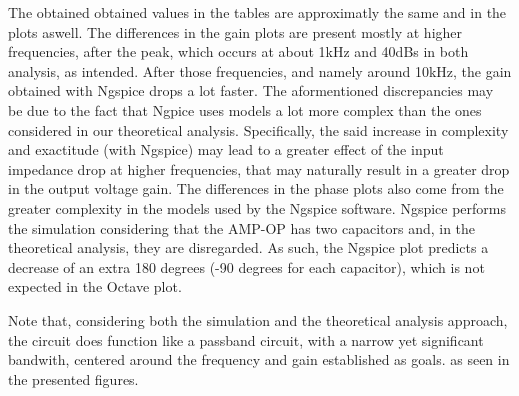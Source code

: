The obtained obtained values in the tables are approximatly the same and in the plots aswell. The differences in the gain plots are present mostly at higher frequencies, after the peak, which occurs at about 1kHz and 40dBs in both analysis, as intended. After those frequencies, and namely around 10kHz, the gain obtained with Ngspice drops a lot faster. The aformentioned discrepancies may be due to the fact that Ngpice uses models a lot more complex than the ones considered in our theoretical analysis. Specifically, the said increase in complexity and exactitude (with Ngspice) may lead to a greater effect of the input impedance drop at higher frequencies, that may naturally result in a greater drop in the output voltage gain. The differences in the phase plots also come from the greater complexity in the models used by the Ngspice software. Ngspice performs the simulation considering that the AMP-OP has two capacitors and, in the theoretical analysis, they are disregarded. As such, the Ngspice plot predicts a decrease of an extra 180 degrees (-90 degrees for each capacitor), which is not expected in the Octave plot.

Note that, considering both the simulation and the theoretical analysis approach, the circuit does function like a passband circuit, with a narrow yet significant bandwith, centered around the frequency and gain established as goals. as seen in the presented figures.
